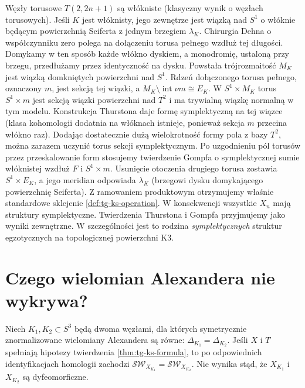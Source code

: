 \begin{uwaga}
Węzły torusowe $T(2,2n+1)$ są włókniste
(klasyczny wynik o węzłach torusowych).
Jeśli $K$ jest włóknisty, jego zewnętrze jest
wiązką nad $S^1$ o włóknie będącym powierzchnią
Seiferta z jednym brzegiem $\lambda_K$.
Chirurgia Dehna o współczynniku zero polega na
dołączeniu torusa pełnego wzdłuż tej długości.
Domykamy w ten sposób każde włókno dyskiem,
a monodromię, ustaloną przy brzegu, przedłużamy
przez identyczność na dysku. Powstała trójrozmaitość
$M_K$ jest wiązką domkniętych powierzchni nad $S^1$.
Rdzeń dołączonego torusa pełnego, oznaczony $m$,
jest sekcją tej wiązki, a
$M_K\setminus\operatorname{int}\nu m\cong E_K$.
W $S^1\times M_K$ torus $S^1\times m$ jest
sekcją wiązki powierzchni nad $T^2$ i ma
trywialną wiązkę normalną w tym modelu.
Konstrukcja Thurstona daje formę symplektyczną
na tej wiązce (klasa kohomologii dodatnia
na włóknach istnieje, ponieważ sekcja
$m$ przecina włókno raz). Dodając dostatecznie
dużą wielokrotność formy pola z bazy $T^2$,
można zarazem uczynić torus sekcji symplektycznym.
Po uzgodnieniu pól torusów przez przeskalowanie
form stosujemy twierdzenie Gompfa o symplektycznej
sumie włóknistej wzdłuż $F$ i $S^1\times m$.
Usunięcie otoczenia drugiego torusa zostawia
$S^1\times E_K$, a jego meridian odpowiada
$\lambda_K$ (brzegowi dysku domykającego
powierzchnię Seiferta). Z ramowaniem produktowym
otrzymujemy właśnie standardowe sklejenie
\ref{def:tg-ks-operation}. W konsekwencji
wszystkie $X_n$ mają struktury symplektyczne.
Twierdzenia Thurstona i Gompfa przyjmujemy
jako wyniki zewnętrzne. W szczególności jest to
rodzina \emph{symplektycznych} struktur egzotycznych
na topologicznej powierzchni K3.
\end{uwaga}

\section{Czego wielomian Alexandera nie wykrywa?}
\label{sec:tg-ks-limits}

\begin{stwierdzenie}
\label{prop:tg-ks-limit}
Niech $K_1,K_2\subset S^3$ będą dwoma węzłami,
dla których symetrycznie znormalizowane wielomiany
Alexandera są równe:
$\Delta_{K_1}=\Delta_{K_2}$.
Jeśli $X$ i $T$ spełniają hipotezy twierdzenia
\ref{thm:tg-ks-formula}, to po odpowiednich
identyfikacjach homologii zachodzi
$\mathcal{SW}_{X_{K_1}}=\mathcal{SW}_{X_{K_2}}$.
Nie wynika stąd, że $X_{K_1}$ i $X_{K_2}$
są dyfeomorficzne.
\end{stwierdzenie}

